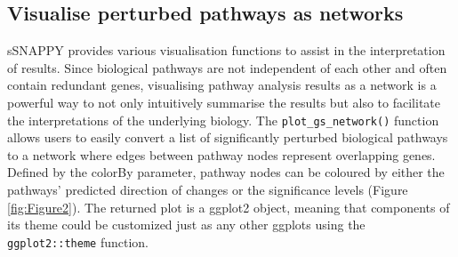 \documentclass[9pt,a4paper,]{extarticle}
\newenvironment{Shaded}{\begin{snugshade}}{\end{snugshade}}
\newcommand{\AttributeTok}[1]{\textcolor[rgb]{0.77,0.63,0.00}{#1}}
\newcommand{\CommentTok}[1]{\textcolor[rgb]{0.56,0.35,0.01}{\textit{#1}}}
\newcommand{\ConstantTok}[1]{\textcolor[rgb]{0.00,0.00,0.00}{#1}}
\newcommand{\DecValTok}[1]{\textcolor[rgb]{0.00,0.00,0.81}{#1}}
\newcommand{\FunctionTok}[1]{\textcolor[rgb]{0.00,0.00,0.00}{#1}}
\newcommand{\NormalTok}[1]{#1}
\newcommand{\OtherTok}[1]{\textcolor[rgb]{0.56,0.35,0.01}{#1}}
\newcommand{\SpecialCharTok}[1]{\textcolor[rgb]{0.00,0.00,0.00}{#1}}
\newcommand{\StringTok}[1]{\textcolor[rgb]{0.31,0.60,0.02}{#1}}
\begin{document}
\begin{Shaded}
\end{Shaded}

\hypertarget{visualise-perturbed-pathways-as-networks}{%
\subsection{Visualise perturbed pathways as networks}\label{visualise-perturbed-pathways-as-networks}}

sSNAPPY provides various visualisation functions to assist in the interpretation of results. Since biological pathways are not independent of each other and often contain redundant genes, visualising pathway analysis results as a network is a powerful way to not only intuitively summarise the results but also to facilitate the interpretations of the underlying biology. The \texttt{plot\_gs\_network()} function allows users to easily convert a list of significantly perturbed biological pathways to a network where edges between pathway nodes represent overlapping genes. Defined by the colorBy parameter, pathway nodes can be coloured by either the pathways' predicted direction of changes or the significance levels (Figure \ref{fig:Figure2}). The returned plot is a ggplot2 \citep{Wickham2009} object, meaning that components of its theme could be customized just as any other ggplots using the \texttt{ggplot2::theme} function.
\end{document}
